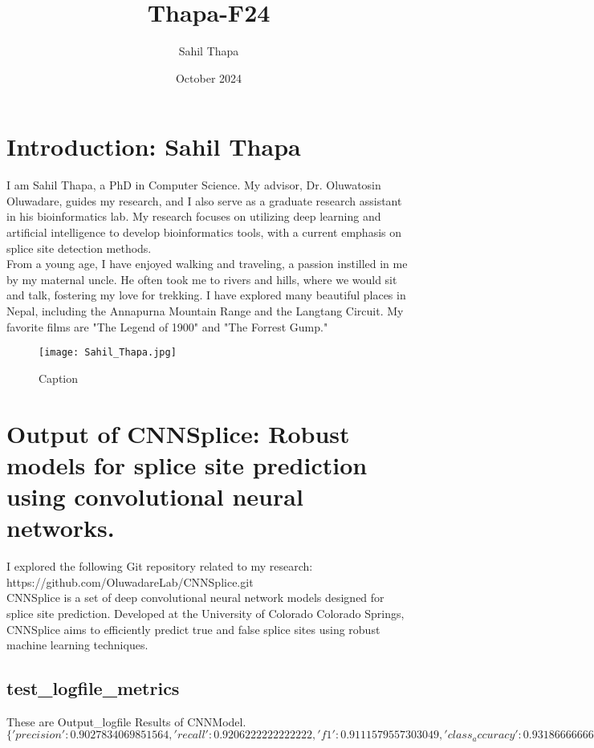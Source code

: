 \documentclass{article}
\title{Thapa-F24}
\author{Sahil Thapa}
\date{October 2024}
\begin{document}
\maketitle

\section{Introduction: Sahil Thapa}
I am Sahil Thapa, a PhD in Computer Science. My advisor, Dr. Oluwatosin Oluwadare, guides my research, and I also serve as a graduate research assistant in his bioinformatics lab. My research focuses on utilizing deep learning and artificial intelligence to develop bioinformatics tools, with a current emphasis on splice site detection methods.\\

From a young age, I have enjoyed walking and traveling, a passion instilled in me by my maternal uncle. He often took me to rivers and hills, where we would sit and talk, fostering my love for trekking. I have explored many beautiful places in Nepal, including the Annapurna Mountain Range and the Langtang Circuit. My favorite films are "The Legend of 1900" and "The Forrest Gump."

\begin{figure}[h!]
    \centering
    \texttt{[image: Sahil\_Thapa.jpg]}
    \caption{Caption}
    \label{fig:enter-label}
\end{figure}

\section{Output of CNNSplice: Robust models for splice site prediction using convolutional neural networks.}
I explored the following Git repository related to my research: https://github.com/OluwadareLab/CNNSplice.git\\

CNNSplice is a set of deep convolutional neural network models designed for splice site prediction. Developed at the University of Colorado Colorado Springs, CNNSplice aims to efficiently predict true and false splice sites using robust machine learning techniques.

\subsection{test\_logfile\_metrics}
These are Output\_logfile Results of CNNModel.\\
$\{'precision': 0.9027834069851564, 'recall': 0.9206222222222222, 'f1': 0.9111579557303049, 'class_accuracy': 0.9318666666666666, 'accuracy': 0.9318666458129883\}$\\
\end{document}
